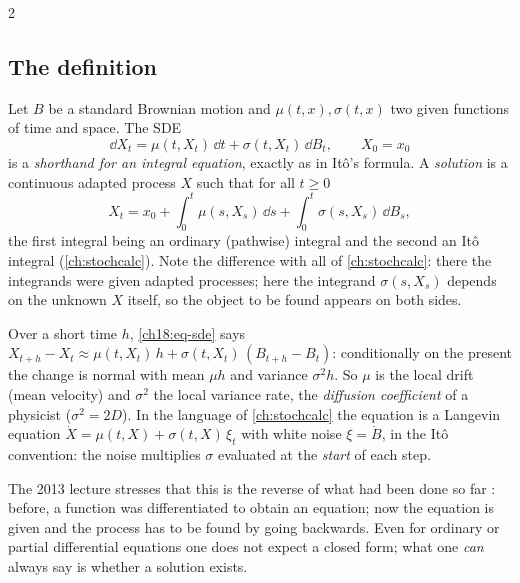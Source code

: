 \begin{paracol}{2}
\subsection{The definition}
Let $B$ be a standard Brownian motion and $\mu(t,x),\sigma(t,x)$ two given functions of time and space. The SDE
\begin{equation}\label{ch18:eq-sde}
  \dd X_t=\mu(t,X_t)\,\dd t+\sigma(t,X_t)\,\dd B_t,\qquad X_0=x_0
\end{equation}
 is a \emph{shorthand for an integral equation}, exactly as in It\^o's formula. A \emph{solution} is a continuous adapted process $X$ such that for all $t\ge0$
\begin{equation}\label{ch18:eq-sdeint}
  X_t=x_0+\int_0^t\mu(s,X_s)\,\dd s+\int_0^t\sigma(s,X_s)\,\dd B_s ,
\end{equation}
the first integral being an ordinary (pathwise) integral and the second an It\^o integral (\cref{ch:stochcalc}). Note the difference with all of \cref{ch:stochcalc}: there the integrands were given adapted processes; here the integrand $\sigma(s,X_s)$ depends on the unknown $X$ itself, so the object to be found appears on both sides.
\begin{intuition}
Over a short time $h$, \eqref{ch18:eq-sde} says $X_{t+h}-X_t\approx\mu(t,X_t)\,h+\sigma(t,X_t)\,(B_{t+h}-B_t)$: conditionally on the present the change is normal with mean $\mu h$ and variance $\sigma^2h$. So $\mu$ is the local drift (mean velocity) and $\sigma^2$ the local variance rate, the \emph{diffusion coefficient} of a physicist ($\sigma^2=2D$). In the language of \cref{ch:stochcalc} the equation is a Langevin equation $\dot X=\mu(t,X)+\sigma(t,X)\,\xi_t$ with white noise $\xi=\dot B$, in the It\^o convention: the noise multiplies $\sigma$ evaluated at the \emph{start} of each step.
\end{intuition}
The 2013 lecture stresses that this is the reverse of what had been done so far : before, a function was differentiated to obtain an equation; now the equation is given and the process has to be found by going backwards. Even for ordinary or partial differential equations one does not expect a closed form; what one \emph{can} always say is whether a solution exists.


\end{paracol}
